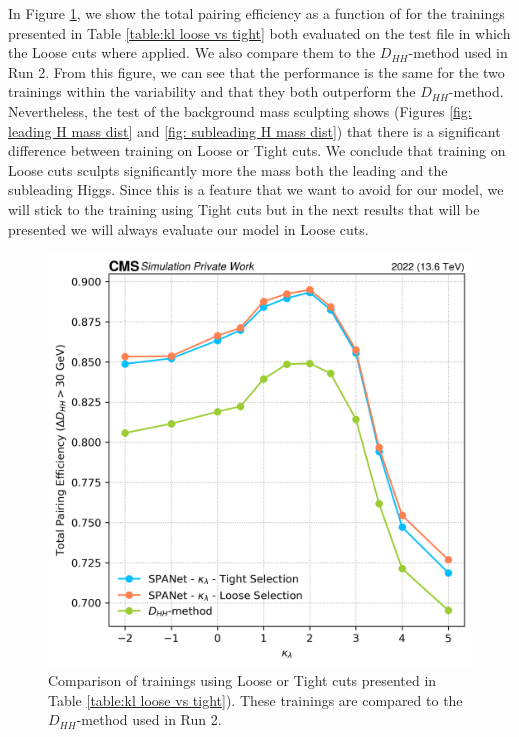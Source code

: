 In Figure \ref{fig: loose vd tight}, we show the total pairing efficiency as a function of \kl for the trainings presented in Table \ref{table:kl loose vs tight} both evaluated on the test file in which the Loose cuts where applied. We also compare them to the $D_{HH}$-method used in Run 2. From this figure, we can see that the performance is the same for the two trainings within the variability and that they both outperform the $D_{HH}$-method. Nevertheless, the test of the background mass sculpting shows (Figures \ref{fig: leading H mass dist} and \ref{fig: subleading H mass dist}) that there is a significant difference between training on Loose or Tight cuts. We conclude that training on Loose cuts sculpts significantly more the mass both the leading and the subleading Higgs. Since this is a feature that we want to avoid for our model, we will stick to the training using Tight cuts but in the next results that will be presented we will always evaluate our model in Loose cuts.

\begin{figure}[hbt]
    \centering
    \includegraphics[width=0.6\linewidth]{Images/6.Improving/kappa lambda/loose vs tight.png}
    \caption{Comparison of trainings using Loose or Tight cuts presented in Table \ref{table:kl loose vs tight}). These trainings are compared to the $D_{HH}$-method used in Run 2.}
    \label{fig: loose vd tight}
\end{figure}

